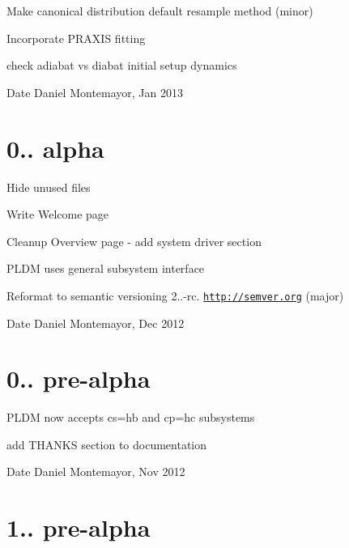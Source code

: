 \begin{DoxyItemize}
\item Make canonical distribution default resample method (minor)
\item Incorporate P\+R\+A\+X\+I\+S fitting
\item check adiabat vs diabat initial setup dynamics \begin{DoxyDate}{Date}
Daniel Montemayor, Jan 2013
\end{DoxyDate}

\end{DoxyItemize}\hypertarget{_tags_v0_1_1a}{}\section{0.. alpha}\label{_tags_v0_1_1a}

\begin{DoxyItemize}
\item Hide unused files
\item Write Welcome page
\item Cleanup Overview page -\/ add system driver section
\item P\+L\+D\+M uses general subsystem interface
\item Reformat to semantic versioning 2..-\/rc. \href{http://semver.org}{\tt http\+://semver.\+org} (major) \begin{DoxyDate}{Date}
Daniel Montemayor, Dec 2012
\end{DoxyDate}

\end{DoxyItemize}\hypertarget{_tags_v0_0_5pa}{}\section{0.. pre-\/alpha}\label{_tags_v0_0_5pa}

\begin{DoxyItemize}
\item P\+L\+D\+M now accepts cs=hb and cp=hc subsystems
\item add T\+H\+A\+N\+K\+S section to documentation \begin{DoxyDate}{Date}
Daniel Montemayor, Nov 2012
\end{DoxyDate}

\end{DoxyItemize}\hypertarget{_tags_v1_0_4pa}{}\section{1.. pre-\/alpha}\label{_tags_v1_0_4pa}

